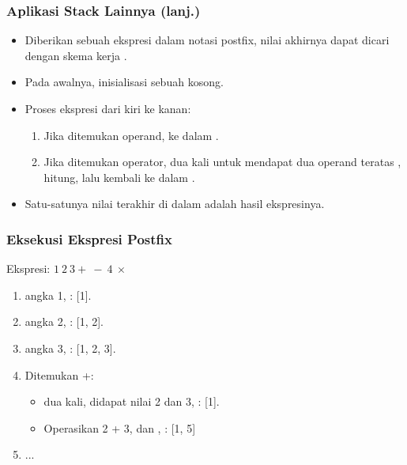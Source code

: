 \begin{frame}
\frametitle{Aplikasi Stack Lainnya (lanj.)}
\begin{itemize}
  \item Diberikan sebuah ekspresi dalam notasi postfix, nilai akhirnya dapat dicari dengan skema kerja .
  \item Pada awalnya, inisialisasi sebuah  kosong.
  \item Proses ekspresi dari kiri ke kanan:
  \begin{enumerate}
    \item Jika ditemukan operand,  ke dalam .
    \item Jika ditemukan operator,  dua kali untuk mendapat dua operand teratas , hitung, lalu  kembali ke dalam .
  \end{enumerate}
  \item Satu-satunya nilai terakhir di dalam  adalah hasil ekspresinya.
\end{itemize}
\end{frame}

\begin{frame}
\frametitle{Eksekusi Ekspresi Postfix}
Ekspresi: $1 \ 2 \ 3 + \ - \ 4 \ \times$
\begin{enumerate}
  \item {} angka 1, : [1].
  \item {} angka 2, : [1, 2].
  \item {} angka 3, : [1, 2, 3].
  \item Ditemukan +:
  \begin{itemize}
    \item {} dua kali, didapat nilai 2 dan 3, : [1].
    \item Operasikan 2 + 3, dan , : [1, 5]
  \end{itemize}
  \item ...
\end{enumerate}
\end{frame}

